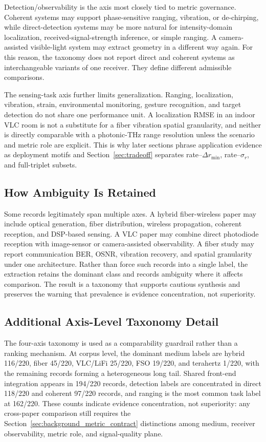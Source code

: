 \documentclass[letterpaper,journal]{IEEEtran}
\begin{document}
Detection/observability is the axis most closely tied to metric governance. Coherent systems may support phase-sensitive ranging, vibration, or de-chirping, while direct-detection systems may be more natural for intensity-domain localization, received-signal-strength inference, or simple ranging. A camera-assisted visible-light system may extract geometry in a different way again. For this reason, the taxonomy does not report direct and coherent systems as interchangeable variants of one receiver. They define different admissible comparisons.

The sensing-task axis further limits generalization. Ranging, localization, vibration, strain, environmental monitoring, gesture recognition, and target detection do not share one performance unit. A localization RMSE in an indoor VLC room is not a substitute for a fiber vibration spatial granularity, and neither is directly comparable with a photonic-THz range resolution unless the scenario and metric role are explicit. This is why later sections phrase application evidence as deployment motifs and Section~\ref{sec:tradeoff} separates rate--\(\Delta r_{\min}\), rate--\(\sigma_r\), and full-triplet subsets.

\subsection{How Ambiguity Is Retained}

Some records legitimately span multiple axes. A hybrid fiber-wireless paper may include optical generation, fiber distribution, wireless propagation, coherent reception, and DSP-based sensing. A VLC paper may combine direct photodiode reception with image-sensor or camera-assisted observability. A fiber study may report communication BER, OSNR, vibration recovery, and spatial granularity under one architecture. Rather than force such records into a single label, the extraction retains the dominant class and records ambiguity where it affects comparison. The result is a taxonomy that supports cautious synthesis and preserves the warning that prevalence is evidence concentration, not superiority.

\subsection{Additional Axis-Level Taxonomy Detail}

The four-axis taxonomy is used as a comparability guardrail rather than a ranking mechanism. At corpus level, the dominant medium labels are hybrid 116/220, fiber 45/220, VLC/LiFi 25/220, FSO 19/220, and terahertz 1/220, with the remaining records forming a heterogeneous long tail. Shared front-end integration appears in 194/220 records, detection labels are concentrated in direct 118/220 and coherent 97/220 records, and ranging is the most common task label at 162/220. These counts indicate evidence concentration, not superiority: any cross-paper comparison still requires the Section~\ref{sec:background_metric_contract} distinctions among medium, receiver observability, metric role, and signal-quality plane.
\end{document}
